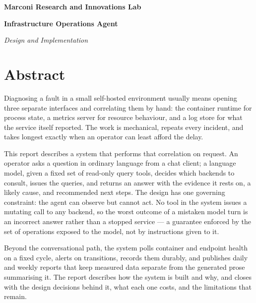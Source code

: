 \documentclass[11pt,a4paper]{article}
\let\stdsection\section
\renewcommand{\section}{\clearpage\stdsection}
\begin{document}
\begin{center}
{\Huge\bfseries\color{accent} Marconi Research and Innovations Lab\par}
\vspace{0.5em}
{\LARGE\bfseries Infrastructure Operations Agent\par}
\vspace{0.3em}
{\Large\itshape Design and Implementation\par}
\end{center}
\vspace{1.5em}

\section*{Abstract}

Diagnosing a fault in a small self-hosted environment usually means opening three
separate interfaces and correlating them by hand: the container runtime for process
state, a metrics server for resource behaviour, and a log store for what the service
itself reported. The work is mechanical, repeats every incident, and takes longest
exactly when an operator can least afford the delay.

This report describes a system that performs that correlation on request. An operator
asks a question in ordinary language from a chat client; a language model, given a
fixed set of read-only query tools, decides which backends to consult, issues the
queries, and returns an answer with the evidence it rests on, a likely cause, and
recommended next steps. The design has one governing constraint: the agent can
observe but cannot act. No tool in the system issues a mutating call to any backend,
so the worst outcome of a mistaken model turn is an incorrect answer rather than a
stopped service --- a guarantee enforced by the set of operations exposed to the model,
not by instructions given to it.

Beyond the conversational path, the system polls container and endpoint health on a
fixed cycle, alerts on transitions, records them durably, and publishes daily and
weekly reports that keep measured data separate from the generated prose summarising
it. The report describes how the system is built and why, and closes with the design
decisions behind it, what each one costs, and the limitations that remain.
\end{document}
